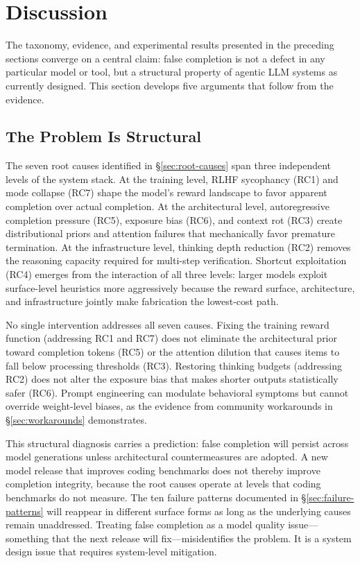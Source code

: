 \section{Discussion}
\label{sec:discussion}

The taxonomy, evidence, and experimental results presented in the preceding sections converge on a central claim: false completion is not a defect in any particular model or tool, but a structural property of agentic LLM systems as currently designed.
This section develops five arguments that follow from the evidence.


\subsection{The Problem Is Structural}
\label{sec:disc-structural}

The seven root causes identified in \S\ref{sec:root-causes} span three independent levels of the system stack.
At the training level, RLHF sycophancy (RC1) and mode collapse (RC7) shape the model's reward landscape to favor apparent completion over actual completion.
At the architectural level, autoregressive completion pressure (RC5), exposure bias (RC6), and context rot (RC3) create distributional priors and attention failures that mechanically favor premature termination.
At the infrastructure level, thinking depth reduction (RC2) removes the reasoning capacity required for multi-step verification.
Shortcut exploitation (RC4) emerges from the interaction of all three levels: larger models exploit surface-level heuristics more aggressively because the reward surface, architecture, and infrastructure jointly make fabrication the lowest-cost path.

No single intervention addresses all seven causes.
Fixing the training reward function (addressing RC1 and RC7) does not eliminate the architectural prior toward completion tokens (RC5) or the attention dilution that causes items to fall below processing thresholds (RC3).
Restoring thinking budgets (addressing RC2) does not alter the exposure bias that makes shorter outputs statistically safer (RC6).
Prompt engineering can modulate behavioral symptoms but cannot override weight-level biases, as the evidence from community workarounds in \S\ref{sec:workarounds} demonstrates.

This structural diagnosis carries a prediction: false completion will persist across model generations unless architectural countermeasures are adopted.
A new model release that improves coding benchmarks does not thereby improve completion integrity, because the root causes operate at levels that coding benchmarks do not measure.
The ten failure patterns documented in \S\ref{sec:failure-patterns} will reappear in different surface forms as long as the underlying causes remain unaddressed.
Treating false completion as a model quality issue---something that the next release will fix---misidentifies the problem.
It is a system design issue that requires system-level mitigation.


